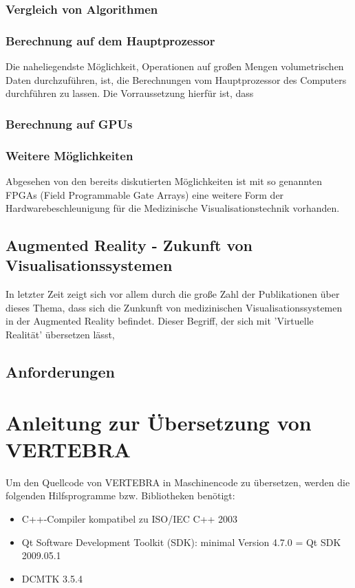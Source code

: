 \documentclass[a4paper]{scrartcl}
\begin{document}
\subsubsection{Vergleich von Algorithmen}\label{ssec:swhwcomparison}
\subsubsection{Berechnung auf dem Hauptprozessor}\label{sssec:cpucalculation}
Die naheliegendste Möglichkeit, Operationen auf großen Mengen volumetrischen Daten durchzuführen, ist, die Berechnungen vom Hauptprozessor des Computers durchführen zu lassen. Die Vorraussetzung hierfür ist, dass 
\subsubsection{Berechnung auf GPUs}\label{sssec:gpucalculation}
\subsubsection{Weitere Möglichkeiten}
Abgesehen von den bereits diskutierten Möglichkeiten ist mit so genannten FPGAs (Field Programmable Gate Arrays) eine weitere Form der Hardwarebeschleunigung für die Medizinische Visualisationstechnik vorhanden.
\subsection{Augmented Reality - Zukunft von Visualisationssystemen}\label{sec:augmentedreality}
In letzter Zeit zeigt sich vor allem durch die große Zahl der Publikationen über dieses Thema, dass sich die Zunkunft von medizinischen Visualisationssystemen in der Augmented Reality befindet. Dieser Begriff, der sich mit 'Virtuelle Realität' übersetzen lässt, \cite{Botden2009}
\appendix \label{appendixstart}
\subsection{Anforderungen}\label{ssec:requirements}
\section{Anleitung zur Übersetzung von VERTEBRA}
Um den Quellcode von VERTEBRA in Maschinencode zu übersetzen, werden die folgenden Hilfsprogramme bzw. Bibliotheken benötigt:
\begin{itemize}
 \item C++-Compiler kompatibel zu ISO/IEC C++ 2003
 \item Qt Software Development Toolkit (SDK): minimal Version 4.7.0 = Qt SDK 2009.05.1
 \item DCMTK 3.5.4
\end{itemize}
\end{document}
